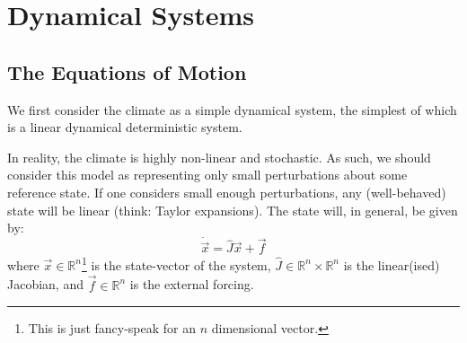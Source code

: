 \chapter{Dynamical Systems}\label{Dynamical Systems}

\section{The Equations of Motion}

We first consider the climate as a simple dynamical system, the simplest of which is a linear dynamical deterministic system.

In reality, the climate is highly non-linear and stochastic. As such, we should consider this model as representing only small perturbations about some reference state. If one considers small enough perturbations, any (well-behaved) state will be linear (think: Taylor expansions). The state will, in general, be given by:
\begin{equation}\label{Dynamical System Eqn}
    \dot{\vec{x}}=\hat{J}\vec{x}+\vec{f}
\end{equation}
where $\vec{x}\in\mathbb{R}^n$\footnote{This is just fancy-speak for an $n$ dimensional vector.} is the state-vector of the system, $\hat{J}\in\mathbb{R}^n\times\mathbb{R}^n$ is the linear(ised) Jacobian, and $\vec{f}\in\mathbb{R}^n$ is the external forcing. 

